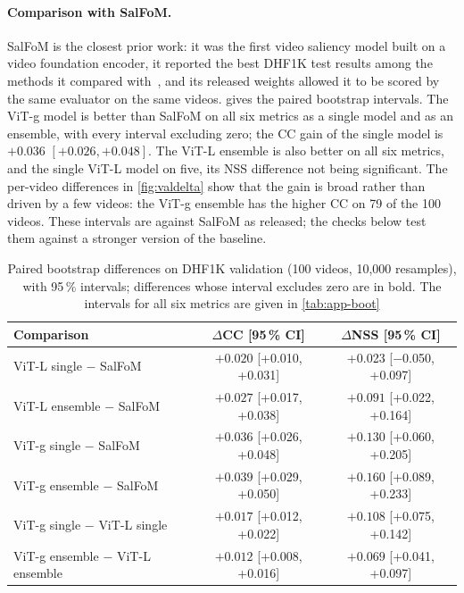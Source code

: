 \paragraph{Comparison with SalFoM.} SalFoM is the closest prior work: it was the
first video saliency model built on a video foundation encoder, it reported the
best DHF1K test results among the methods it compared
with~\cite{moradi2024salfom}, and its released weights allowed it to be scored
by the same evaluator on the same videos.  gives the paired
bootstrap intervals. The \acrshort{ViT}-g model is better than SalFoM on all six metrics as a single
model and as an ensemble, with every interval excluding zero; the \acrshort{CC} gain of
the single model is $+0.036$ $[+0.026, +0.048]$. The \acrshort{ViT}-L ensemble is also
better on all six metrics, and the single \acrshort{ViT}-L model on five, its \acrshort{NSS}
difference not being significant. The per-video differences in \cref{fig:valdelta} show that
the gain is broad rather than driven by a few videos: the \acrshort{ViT}-g ensemble has
the higher \acrshort{CC} on 79 of the 100 videos. These intervals are against SalFoM as
released; the checks below test them against a stronger version of the baseline.

\begin{table}[htbp]
  \centering
  \caption{Paired bootstrap differences on DHF1K validation (100 videos, 10,000
  resamples), with 95\,\% intervals; differences whose interval excludes zero are
  in bold. The intervals for all six metrics are given in
  \cref{tab:app-boot}}\label{tab:dhf1k-boot}
  \small
  \begin{tabular}{@{}lcc@{}}
    \toprule
    \textbf{Comparison} & $\Delta$\textbf{\acrshort{CC}} [95\,\% \acrshort{CI}] & $\Delta$\textbf{\acrshort{NSS}} [95\,\% \acrshort{CI}] \\
    \midrule
    \acrshort{ViT}-L single $-$ SalFoM           & $\mathbf{+0.020}$ [+0.010, +0.031] & +0.023 [$-$0.050, +0.097] \\
    \acrshort{ViT}-L ensemble $-$ SalFoM         & $\mathbf{+0.027}$ [+0.017, +0.038] & $\mathbf{+0.091}$ [+0.022, +0.164] \\
    \acrshort{ViT}-g single $-$ SalFoM           & $\mathbf{+0.036}$ [+0.026, +0.048] & $\mathbf{+0.130}$ [+0.060, +0.205] \\
    \acrshort{ViT}-g ensemble $-$ SalFoM         & $\mathbf{+0.039}$ [+0.029, +0.050] & $\mathbf{+0.160}$ [+0.089, +0.233] \\
    \acrshort{ViT}-g single $-$ \acrshort{ViT}-L single     & $\mathbf{+0.017}$ [+0.012, +0.022] & $\mathbf{+0.108}$ [+0.075, +0.142] \\
    \acrshort{ViT}-g ensemble $-$ \acrshort{ViT}-L ensemble & $\mathbf{+0.012}$ [+0.008, +0.016] & $\mathbf{+0.069}$ [+0.041, +0.097] \\
    \bottomrule
  \end{tabular}
\end{table}

